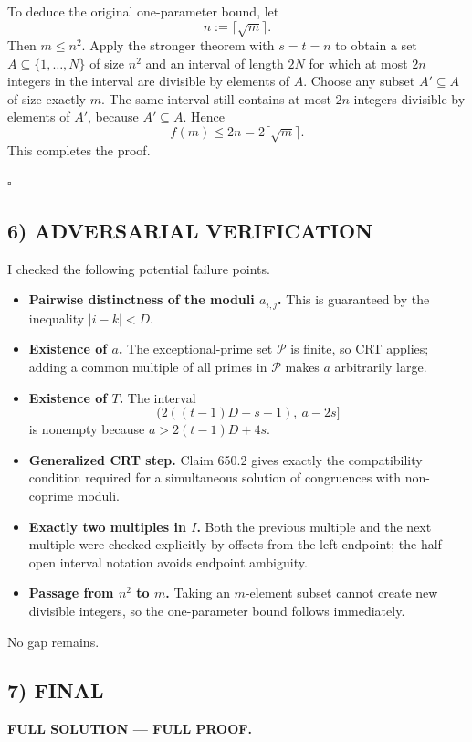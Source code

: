 To deduce the original one-parameter bound, let
\[
 n:=\lceil\sqrt m\rceil.
\]
Then $m\le n^2$.
Apply the stronger theorem with $s=t=n$ to obtain a set $A\subseteq\{1,\dots,N\}$ of size $n^2$ and an interval of length $2N$ for which at most $2n$ integers in the interval are divisible by elements of $A$.
Choose any subset $A'\subseteq A$ of size exactly $m$.
The same interval still contains at most $2n$ integers divisible by elements of $A'$, because $A'\subseteq A$.
Hence
\[
 f(m)\le 2n=2\lceil\sqrt m\rceil.
\]
This completes the proof.

\hfill$\square$

\subsection*{6) ADVERSARIAL VERIFICATION}
I checked the following potential failure points.

\begin{itemize}
\item \textbf{Pairwise distinctness of the moduli $a_{i,j}$.}  This is guaranteed by the inequality $|i-k|<D$.
\item \textbf{Existence of $a$.}  The exceptional-prime set $\mathcal P$ is finite, so CRT applies; adding a common multiple of all primes in $\mathcal P$ makes $a$ arbitrarily large.
\item \textbf{Existence of $T$.}  The interval
\[
\bigl(2((t-1)D+s-1),\ a-2s\bigr]
\]
is nonempty because $a>2(t-1)D+4s$.
\item \textbf{Generalized CRT step.}  Claim 650.2 gives exactly the compatibility condition required for a simultaneous solution of congruences with non-coprime moduli.
\item \textbf{Exactly two multiples in $I$.}  Both the previous multiple and the next multiple were checked explicitly by offsets from the left endpoint; the half-open interval notation avoids endpoint ambiguity.
\item \textbf{Passage from $n^2$ to $m$.}  Taking an $m$-element subset cannot create new divisible integers, so the one-parameter bound follows immediately.
\end{itemize}

No gap remains.

\subsection*{7) FINAL}
\textbf{FULL SOLUTION --- FULL PROOF.}


